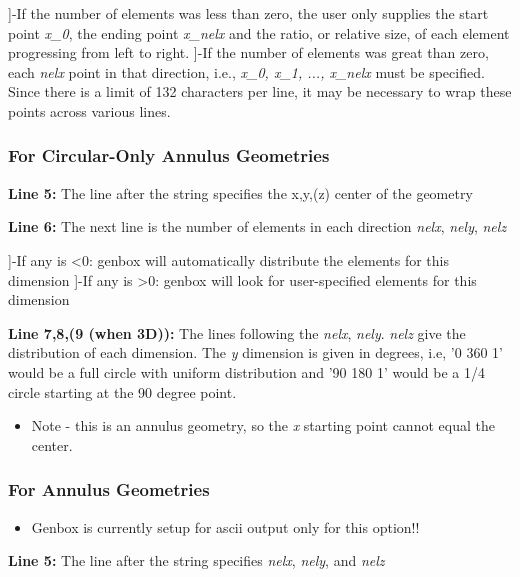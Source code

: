 \begin{description}]-If the number of elements was less than zero, the user only supplies the start point \textit{x\_0}, the ending point \textit{x\_nelx} and the ratio, or relative size, of each element progressing from left to right.
  ]-If the number of elements was great than zero, each \textit{nelx} point in that direction, i.e., \textit{x\_0, x\_1, ..., x\_nelx} must be specified.  Since there is a limit of 132 characters per line, it may be necessary to wrap these points across various lines.
\end{description}




\subsubsection{ For Circular-Only Annulus Geometries}
\par \textbf{Line 5:} The line after the string specifies the x,y,(z) center of the geometry
\par \textbf{Line 6:} The next line is the number of elements in each direction \textit{nelx}, \textit{nely}, \textit{nelz}

\begin{description}]-If any is <0: genbox will automatically distribute the elements for this dimension
  ]-If any is >0: genbox will look for user-specified elements for this dimension
\end{description}
\par \textbf{Line 7,8,(9 (when 3D)):} The lines following the \textit{nelx}, \textit{nely}. \textit{nelz} give the distribution of each dimension.  The \textit{y} dimension is given in degrees, i.e, '0 360 1' would be a full circle with uniform distribution and '90 180 1' would be a 1/4 circle starting at the 90 degree point.

\begin{itemize}\item Note - this is an annulus geometry, so the \textit{x} starting point cannot equal the center.
  \end{itemize}
  \subsubsection{ For Annulus Geometries}
\begin{itemize}\item Genbox is currently setup for ascii output only for this option!!
  \end{itemize}
  \par \textbf{Line 5:} The line after the string specifies \textit{nelx}, \textit{nely}, and \textit{nelz}

